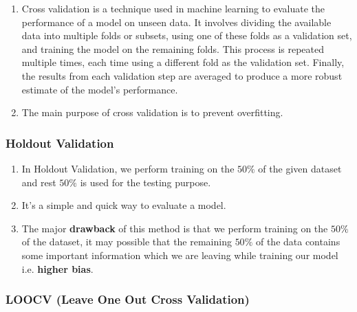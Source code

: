 \begin{enumerate}
    \item Cross validation is a technique used in machine learning to evaluate the performance of a model on unseen data. It involves dividing the available data into multiple folds or subsets, using one of these folds as a validation set, and training the model on the remaining folds. This process is repeated multiple times, each time using a different fold as the validation set. Finally, the results from each validation step are averaged to produce a more robust estimate of the model’s performance. \cite{geeksforgeeks/cross-validation-machine-learning/}

    \item The main purpose of cross validation is to prevent overfitting.
\end{enumerate}

\subsubsection{Holdout Validation \cite{geeksforgeeks/cross-validation-machine-learning/}} \label{Cross-Validation: Holdout Validation}

\begin{enumerate}
    \item In Holdout Validation, we perform training on the $50\%$ of the given dataset and rest $50\%$ is used for the testing purpose. 
    
    \item It’s a simple and quick way to evaluate a model. 
    
    \item The major \textbf{drawback} of this method is that we perform training on the $50\%$ of the dataset, it may possible that the remaining $50\%$ of the data contains some important information which we are leaving while training our model i.e. \textbf{higher bias}.

\end{enumerate}


\subsubsection{LOOCV (Leave One Out Cross Validation) \cite{geeksforgeeks/cross-validation-machine-learning/}} \label{Cross-Validation: LOOCV (Leave One Out Cross Validation)}


